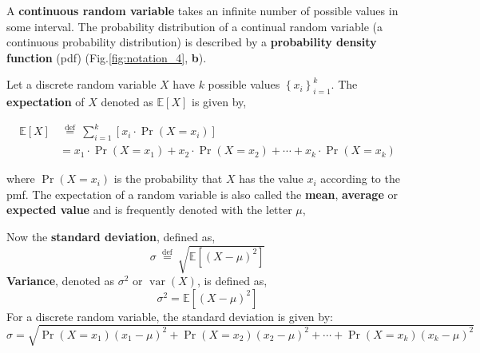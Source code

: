A \textbf{continuous random variable} takes an infinite number of possible values in some interval. The probability distribution of a continual random variable (a continuous probability distribution) is described by a \textbf{probability density function} (pdf) (Fig.\ref{fig:notation_4}, \textbf{b}).

Let a discrete random variable \(X\) have \(k\) possible values \(\left\{x_{i}\right\}_{i=1}^{k}\). The \textbf{expectation} of \(X\) denoted as \(\mathbb{E}[X]\) is given by,

$$
	\begin{aligned} \mathbb{E}[X] & \stackrel{\text { def }}{=} \sum_{i=1}^{k}\left[x_{i} \cdot \operatorname{Pr}\left(X=x_{i}\right)\right] \\ & =x_{1} \cdot \operatorname{Pr}\left(X=x_{1}\right)+x_{2} \cdot \operatorname{Pr}\left(X=x_{2}\right)+\cdots+x_{k} \cdot \operatorname{Pr}\left(X=x_{k}\right)\end{aligned}
$$

where \(\operatorname{Pr}\left(X=x_{i}\right)\) is the probability that \(X\) has the value \(x_{i}\) according to the pmf. The expectation of a random variable is also called the \textbf{mean}, \textbf{average} or \textbf{expected value} and is frequently denoted with the letter \(\mu\),

Now the \textbf{standard deviation}, defined as,
$$
	\sigma \stackrel{\text { def }}{=} \sqrt{\mathbb{E}\left[(X-\mu)^{2}\right]}
$$
\textbf{Variance}, denoted as \(\sigma^{2}\) or \(\operatorname{var}(X)\), is defined as,
$$
	\sigma^{2}=\mathbb{E}\left[(X-\mu)^{2}\right]
$$
For a discrete random variable, the standard deviation is given by:
$$
	\sigma=\sqrt{\operatorname{Pr}\left(X=x_{1}\right)\left(x_{1}-\mu\right)^{2}+\operatorname{Pr}\left(X=x_{2}\right)\left(x_{2}-\mu\right)^{2}+\cdots+\operatorname{Pr}\left(X=x_{k}\right)\left(x_{k}-\mu\right)^{2}}
$$

